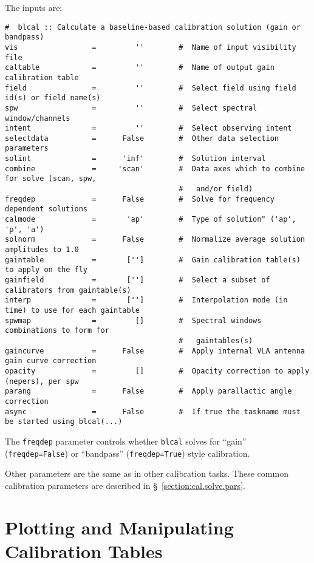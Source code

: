 {The inputs are:
\small
\begin{verbatim}
#  blcal :: Calculate a baseline-based calibration solution (gain or bandpass)
vis                 =         ''        #  Name of input visibility file
caltable            =         ''        #  Name of output gain calibration table
field               =         ''        #  Select field using field id(s) or field name(s)
spw                 =         ''        #  Select spectral window/channels
intent              =         ''        #  Select observing intent
selectdata          =      False        #  Other data selection parameters
solint              =      'inf'        #  Solution interval
combine             =     'scan'        #  Data axes which to combine for solve (scan, spw,
                                        #   and/or field)
freqdep             =      False        #  Solve for frequency dependent solutions
calmode             =       'ap'        #  Type of solution" ('ap', 'p', 'a')
solnorm             =      False        #  Normalize average solution amplitudes to 1.0
gaintable           =       ['']        #  Gain calibration table(s) to apply on the fly
gainfield           =       ['']        #  Select a subset of calibrators from gaintable(s)
interp              =       ['']        #  Interpolation mode (in time) to use for each gaintable
spwmap              =         []        #  Spectral windows combinations to form for
                                        #   gaintables(s)
gaincurve           =      False        #  Apply internal VLA antenna gain curve correction
opacity             =         []        #  Opacity correction to apply (nepers), per spw
parang              =      False        #  Apply parallactic angle correction
async               =      False        #  If true the taskname must be started using blcal(...)

\end{verbatim}
\normalsize

The {\tt freqdep} parameter controls whether {\tt blcal} solves for 
``gain'' ({\tt freqdep=False}) or ``bandpass'' ({\tt freqdep=True})
style calibration.

Other parameters are the same as in other calibration tasks.
These common calibration parameters are described in
\S~\ref{section:cal.solve.pars}.

\section{Plotting and Manipulating Calibration Tables}
\label{section:cal.tables}

}
